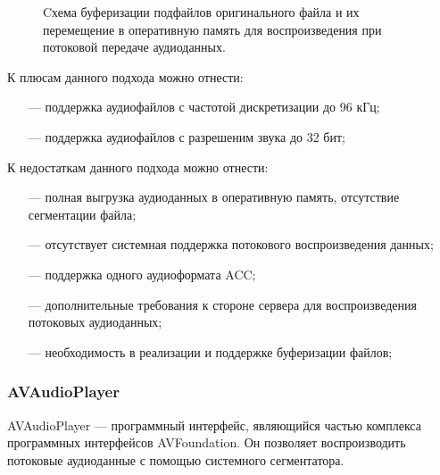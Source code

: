 		\newpage
		\begin{figure}[!h]
			\caption{Cхема буферизации подфайлов оригинального файла и их перемещение в оперативную память для воспроизведения при потоковой передаче аудиоданных.}
			\label{fig:avplayer-buffer}
		\end{figure}

		\par К плюсам данного подхода можно отнести:
		\begin{itemize}
			\item[---] поддержка аудиофайлов с частотой дискретизации до 96 кГц;
			\item[---] поддержка аудиофайлов с разрешеним звука до 32 бит;
		\end{itemize}

		\par К недостаткам данного подхода можно отнести:
		\begin{itemize}
			\item[---] полная выгрузка аудиоданных в оперативную память, отсутствие сегментации файла;
			\item[---] отсутствует системная поддержка потокового воспроизведения данных;
			\item[---] поддержка одного аудиоформата ACC;
			\item[---] дополнительные требования к стороне сервера для воспроизведения потоковых аудиоданных;
			\item[---] необходимость в реализации и поддержке буферизации файлов; 
		\end{itemize}

	\subsubsection{AVAudioPlayer}
		\par AVAudioPlayer \cite{avaudioplayer} --- программный интерфейс, являющийся частью комплекса программных интерфейсов AVFoundation.
		Он позволяет воспроизводить потоковые аудиоданные с помощью системного сегментатора.

